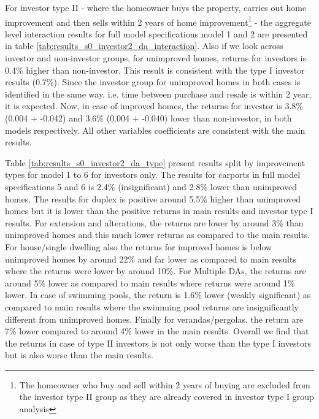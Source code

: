 \documentclass{article}
\begin{document}


For investor type II - where the homeowner buys the property, carries out home improvement and then sells within 2 years of home improvement\footnote{The homeowner who buy and sell within 2 years of buying are excluded from the investor type II group as they are already covered in investor type I group analysis} - the aggregate level interaction results for full model specifications model 1 and 2 are presented in table \ref{tab:results_s0_investor2_da_interaction}. 
Also if we look across investor and non-investor groups, for unimproved homes, returns for investors is 0.4\% higher than non-investor. This result is consistent with the type I investor results (0.7\%). Since the investor group for unimproved homes in both cases is identified in the same way. i.e. time between purchase and resale is within 2 year, it is expected. Now, in case of improved homes, the returns for investor is 3.8\% (0.004 + -0.042) and 3.6\% (0.004 + -0.040) lower than non-investor, in both models respectively. All other variables coefficients are consistent with the main results.

Table \ref{tab:results_s0_investor2_da_type} present results split by improvement types for model 1 to 6 for investors only. The results for carports in full model specifications 5 and 6 is 2.4\% (insignificant) and 2.8\% lower than unimproved homes. The results for duplex is positive around 5.5\% higher than unimproved homes but it is lower than the positive returns in main results and investor type I results. For extension and alterations, the returns are lower by around 3\% than unimproved homes and this much lower returns as compared to the main results. For house/single dwelling also the returns for improved homes is below unimproved homes by around 22\% and far lower as compared to main results where the returns were lower by around 10\%. For Multiple DAs, the returns are around 5\% lower as compared to main results where returns were around 1\% lower. In case of swimming pools, the return is 1.6\% lower (weakly significant) as compared to main results where the swimming pool returns are insignificantly different from unimproved homes. Finally for verandas/pergolas, the return are 7\% lower compared to around 4\% lower in the main results. Overall we find that the returns in case of type II investors is not only worse than the type I investors but is also worse than the main results.


\end{document}
